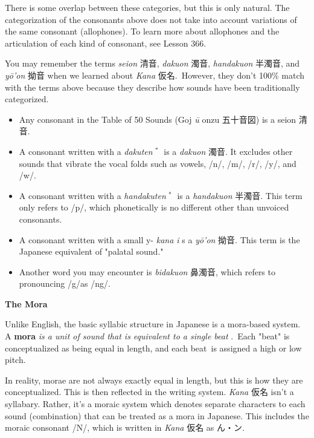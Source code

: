\par{ There is some overlap between these categories, but this is only natural. The categorization of the consonants above does not take into account variations of the same consonant (allophones). To learn more about allophones and the articulation of each kind of consonant, see Lesson 366. }

\par{ You may remember the terms \emph{seion }清音, \emph{dakuon }濁音, \emph{handakuon }半濁音, and \emph{yō'on }拗音 when we learned about \emph{Kana }仮名. However, they don't 100\% match with the terms above because they describe how sounds have been traditionally categorized. }

\begin{itemize}

\item Any consonant in the Table of 50 Sounds (Goj \emph{ū }onzu 五十音図) is a seion 清音. 
\item A consonant written with a \emph{dakuten }゛is a \emph{dakuon }濁音. It excludes other sounds that vibrate the vocal folds such as vowels, \slash n\slash , \slash m\slash , \slash r\slash , \slash y\slash , and \slash w\slash . 
\item A consonant written with a \emph{handakuten }゜is a \emph{handakuon }半濁音. This term only refers to \slash p\slash , which phonetically is no different other than unvoiced consonants. 
\item A consonant written with a small y- \emph{kana i }s a \emph{yō'on }拗音. This term is the Japanese equivalent of "palatal sound." 
\item Another word you may encounter is \emph{bidakuon }鼻濁音, which refers to pronouncing \slash g\slash  as \slash ng\slash . 
\end{itemize}

\begin{center}
\textbf{The Mora } 
\end{center}

\par{ Unlike English, the basic syllabic structure in Japanese is a mora-based system. A \textbf{mora } \emph{is a unit of sound that is equivalent to a single beat }. Each "beat" is conceptualized as being equal in length, and each beat is assigned a high or low pitch. }

\par{ In reality, morae are not always exactly equal in length, but this is how they are conceptualized. This is then reflected in the writing system. \emph{Kana }仮名 isn't a syllabary. Rather, it's a moraic system which denotes separate characters to each sound (combination) that can be treated as a mora in Japanese. This includes the moraic consonant \slash N\slash , which is written in \emph{Kana }仮名 as ん・ン. }

